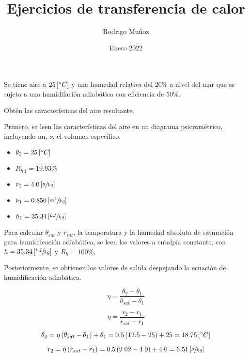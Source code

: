 \documentclass[11pt]{article}
\title{Ejercicios de transferencia de calor}
\author{Rodrigo Muñoz}
\date{Enero 2022}
\begin{document}
\maketitle

\section{}

Se tiene aire a $ 25 \left[ \degree C \right] $ y una humedad relativa del $ 20\% $ a nivel del mar que se sujeta a una humidifación adiabática con eficiencia de $ 50\% $. 

Obtén las características del aire resultante.

Primero, se leen las características del aire en un diagrama psicrométrico, incluyendo nu, $ \nu $, el volumen específico.

\begin{itemize}
    \item
	$ \theta _1 = 25 \left[ \degree C \right] $

    \item
	$ R_{ h \, 1 } = 19.93\% $

    \item
	$ r_1 = 4.0 \left[ \sfrac{ g }{ kg } \right] $
	
    \item
    $ \nu _1 = 0.850 \left[ \sfrac{ m ^3 }{ kg } \right] $
	
    \item
    $ h_1 = 35.34 \left[ \sfrac{ kJ }{ kg } \right] $

\end{itemize}

Para calcular $ \theta _{ sat } $ y $ r_{ sat } $, la temperatura y la humedad absoluta de saturación para humidifcación adiabática, se leen los valores a entalpía constante, con $ h = 35.34 \left[ \sfrac{ kJ }{ kg } \right] $ y $ R_h = 100\% $.

Posteriormente, se obtienen los valores de salida despejando la ecuación de humidificación adiabática.

\[ \eta = \frac{ \theta _2 - \theta _1 }{ \theta _ { sat } - \theta _1 } \]

\[ \eta = \frac{ r_2 - r_1 }{ r_{ sat } - r_1 } \]

\[ \theta _2 = \eta \left( \theta _{ sat } - \theta _1 \right) + \theta _1 = 0.5 \left( 12.5 - 25 \right) + 25 = 18.75 \left[ \degree C \right] \]

\[ r_2 = \eta \left( r_{ sat } - r_1 \right) = 0.5 \left( 9.02 - 4.0 \right) + 4.0 = 6.51 \left[ \sfrac{ g }{ kg } \right] \]
\end{document}
